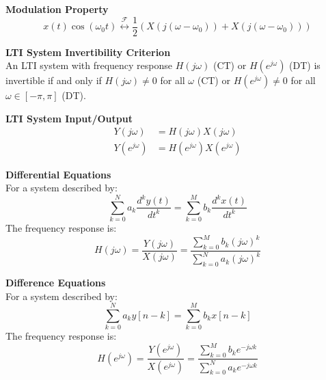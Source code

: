 \documentclass[8pt]{article}
\begin{document}
\begin{multicols}{2}
    \noindent\textbf{Modulation Property} \\
    \begin{equation}
        x(t)\cos(\omega_0 t) \overset{\mathcal{F}}{\leftrightarrow} \frac{1}{2}\left( X(j(\omega-\omega_0)) + X(j(\omega-\omega_0))\right)
    \end{equation}

    \noindent\textbf{LTI System Invertibility Criterion} \\
    An LTI system with frequency response $H(j\omega)$ (CT) or $H(e^{j\omega})$ (DT) is
    invertible if and only if $H(j\omega) \neq 0$ for all $\omega$ (CT) or $H(e^{j\omega})
        \neq 0$ for all $\omega \in [-\pi, \pi]$ (DT).

    \noindent\textbf{LTI System Input/Output}
    \begin{align}
        Y(j\omega)     & = H(j\omega)X(j\omega)         \\
        Y(e^{j\omega}) & = H(e^{j\omega})X(e^{j\omega})
    \end{align}

    \noindent\textbf{Differential Equations} \\
    For a system described by:
    \begin{equation*}
        \sum_{k=0}^{N} a_k \frac{d^k y(t)}{dt^k} = \sum_{k=0}^{M} b_k \frac{d^k x(t)}{dt^k}
    \end{equation*}
    The frequency response is:
    \begin{equation} \label{eq:diff_eq_Hjw}
        H(j\omega) = \frac{Y(j\omega)}{X(j\omega)} = \frac{\sum_{k=0}^{M} b_k (j\omega)^k}{\sum_{k=0}^{N} a_k (j\omega)^k}
    \end{equation}

    \noindent\textbf{Difference Equations} \\
    For a system described by:
    \begin{equation*}
        \sum_{k=0}^{N} a_k y[n-k] = \sum_{k=0}^{M} b_k x[n-k]
    \end{equation*}
    The frequency response is:
    \begin{equation} \label{eq:diff_eq_Hejomega}
        H(e^{j\omega}) = \frac{Y(e^{j\omega})}{X(e^{j\omega})} = \frac{\sum_{k=0}^{M} b_k e^{-j\omega k}}{\sum_{k=0}^{N} a_k e^{-j\omega k}}
    \end{equation}

    \newpage


\end{multicols}
\end{document}
